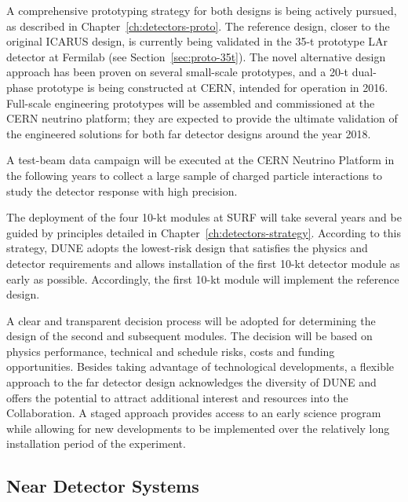 A comprehensive prototyping strategy for both designs is being
actively pursued, as described in Chapter~\ref{ch:detectors-proto}.
The reference design, closer to the original ICARUS design, is
currently being validated in the 35-t prototype LAr detector at
Fermilab (see Section~\ref{sec:proto-35t}).  The novel alternative
design approach has been proven on several small-scale prototypes, and
a 20-t dual-phase prototype is being constructed at CERN, intended for
operation in 2016.  Full-scale engineering prototypes will be
assembled and commissioned at the CERN neutrino platform; 
they are expected to provide the ultimate validation of the engineered
solutions for both far detector designs around the year 2018.

A test-beam data campaign will be executed at the CERN Neutrino Platform in the following years to
collect a large sample of charged particle interactions to study the
detector response with high precision.

The deployment of the four 10-kt modules at SURF will take several
years and be guided by principles detailed in
Chapter~\ref{ch:detectors-strategy}. According to this strategy, DUNE
adopts the lowest-risk design that satisfies the physics and detector
requirements and allows installation of the first 10-kt detector
module as early as possible.  Accordingly, the first 10-kt module will
implement the reference design.  

A clear and transparent decision process will be adopted for
determining the design of the second and subsequent modules.  The
decision will be based on physics performance, technical and schedule
risks, costs and funding opportunities.  Besides taking advantage of
technological developments, a flexible approach to the far detector
design acknowledges the diversity of DUNE and offers the potential to
attract additional interest and resources into the Collaboration. A
staged approach provides access to an early science program while
allowing for new developments to be implemented over the relatively
long installation period of the experiment.

\subsection{Near Detector Systems}
\label{sec:intro-dune-near-det}

